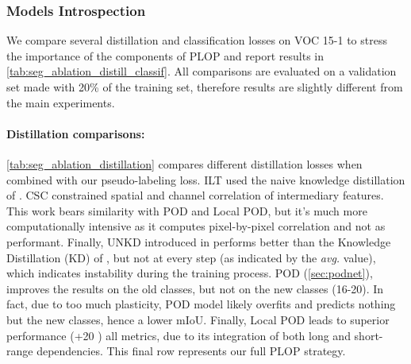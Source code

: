 \subsubsection{Models Introspection}

We compare several distillation and classification losses on VOC 15-1 to stress the importance of
the components of PLOP and report results in \autoref{tab:seg_ablation_distill_classif}. All
comparisons are evaluated on a validation set made with 20\% of the training set, therefore results
are slightly different from the main experiments.

\paragraph{Distillation comparisons:} \autoref{tab:seg_ablation_distillation} compares different
distillation losses when combined with our pseudo-labeling loss. ILT \citep{michieli2019ilt} used
the naive knowledge distillation of \citet{hinton2015knowledge_distillation}. CSC \citep{park2020csc}
constrained spatial and channel correlation of intermediary features. This work bears similarity
with POD and Local POD, but it's much more computationally intensive as it computes pixel-by-pixel
correlation and not as performant. Finally, UNKD introduced in
\citet{cermelli2020modelingthebackground} performs better than the Knowledge Distillation (KD) of
\citet{hinton2015knowledge_distillation}, but not at every step (as indicated by the \textit{avg.}
value), which indicates instability during the training process. POD (\autoref{sec:podnet}),
improves the results on the old classes, but not on the new classes (16-20). In fact, due to too
much plasticity, POD model likely overfits and predicts nothing but the new classes, hence a lower
\ac{mIoU}.  Finally, Local POD leads to superior performance (+20 \pp) \wrt all metrics, due to its
integration of both long and short-range dependencies. This final row represents our full PLOP
strategy.




